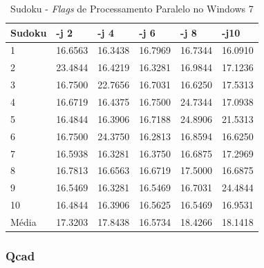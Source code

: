 \begin{apendicesenv}
\begin{table}[!ht]
\centering
\tiny
\caption{Sudoku - \textit{Flags} de Processamento Paralelo no Windows 7}
\label{tab:flag_processamento_paralelo:windows:sudoku}
\begin{tabular}{llllll}
\textbf{Sudoku} & \textbf{-j 2} & \textbf{-j 4} & \textbf{-j 6} & \textbf{-j 8} & \textbf{-j10}  \\ \toprule
1        & 16.6563 & 16.3438 & 16.7969 & 16.7344 & 16.0910  \\ 
2        & 23.4844 & 16.4219 & 16.3281 & 16.9844 & 17.1236  \\ 
3        & 16.7500 & 22.7656 & 16.7031 & 16.6250 & 17.5313  \\ 
4        & 16.6719 & 16.4375 & 16.7500 & 24.7344 & 17.0938  \\ 
5        & 16.4844 & 16.3906 & 16.7188 & 24.8906 & 21.5313  \\ 
6        & 16.7500 & 24.3750 & 16.2813 & 16.8594 & 16.6250  \\ 
7        & 16.5938 & 16.3281 & 16.3750 & 16.6875 & 17.2969  \\ 
8        & 16.7813 & 16.6563 & 16.6719 & 17.5000 & 16.6875  \\ 
9        & 16.5469 & 16.3281 & 16.5469 & 16.7031 & 24.4844  \\ 
10       & 16.4844 & 16.3906 & 16.5625 & 16.5469 & 16.9531  \\ \bottomrule
Média    & 17.3203 & 17.8438 & 16.5734 & 18.4266 & 18.1418  \\ 
\end{tabular}
\end{table}

\clearpage
\subsubsection*{Qcad}


\end{apendicesenv}
